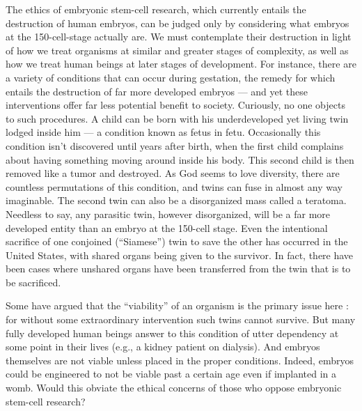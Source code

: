 \documentclass[a4paper,14pt]{extarticle}
\begin{document}
The ethics of embryonic stem-cell research, which currently entails the destruction of human embryos, can be judged only by considering what embryos at the 150-cell-stage actually are.
We must contemplate their destruction in light of how we treat organisms at similar and greater stages of complexity, as well as how we treat human beings at later stages of development.
For instance, there are a variety of conditions that can occur during gestation, the remedy for which entails the destruction of far more developed embryos --- and yet these interventions offer far less potential benefit to society.
Curiously, no one objects to such procedures.
A child can be born with his underdeveloped yet living twin lodged inside him --- a condition known as fetus in fetu.
Occasionally this condition isn’t discovered until years after birth, when the first child complains about having something moving around inside his body.
This second child is then removed like a tumor and destroyed.
As God seems to love diversity, there are countless permutations of this condition, and twins can fuse in almost any way imaginable.
The second twin can also be a disorganized mass called a teratoma.
Needless to say, any parasitic twin, however disorganized, will be a far more developed entity than an embryo at the 150-cell stage.
Even the intentional sacrifice of one conjoined (``Siamese'') twin to save the other has occurred in the United States, with shared organs being given to the survivor.
In fact, there have been cases where unshared organs have been transferred from the twin that is to be sacrificed.

Some have argued that the ``viability'' of an organism is the primary issue here :
for without some extraordinary intervention such twins cannot survive.
But many fully developed human beings answer to this condition of utter dependency at some point in their lives (e.g., a kidney patient on dialysis).
And embryos themselves are not viable unless placed in the proper conditions.
Indeed, embryos could be engineered to not be viable past a certain age even if implanted in a womb.
Would this obviate the ethical concerns of those who oppose embryonic stem-cell research?
\end{document}
